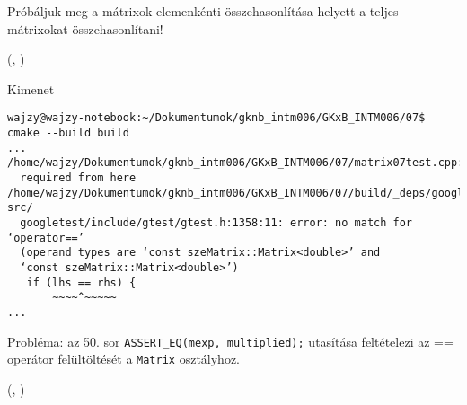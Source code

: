 \begin{frame}
  Próbáljuk meg a mátrixok elemenkénti összehasonlítása helyett a teljes mátrixokat összehasonlítani!
  \begin{exampleblock}{ %
    (, %
     )}
    \scriptsize
    
  \end{exampleblock}
\end{frame}

\begin{frame}
  \begin{exampleblock}{}
    
  \end{exampleblock}
\end{frame}

\begin{frame}[fragile]
  \begin{block}{Kimenet}
    \footnotesize
    \begin{verbatim}
wajzy@wajzy-notebook:~/Dokumentumok/gknb_intm006/GKxB_INTM006/07$ cmake --build build
...
/home/wajzy/Dokumentumok/gknb_intm006/GKxB_INTM006/07/matrix07test.cpp:50:3:   
  required from here
/home/wajzy/Dokumentumok/gknb_intm006/GKxB_INTM006/07/build/_deps/googletest-src/
  googletest/include/gtest/gtest.h:1358:11: error: no match for ‘operator==’ 
  (operand types are ‘const szeMatrix::Matrix<double>’ and 
  ‘const szeMatrix::Matrix<double>’)
   if (lhs == rhs) {
       ~~~~^~~~~~
...
\end{verbatim}
  \end{block}
  \vspace{-0.3cm}
  Probléma: az 50. sor \texttt{ASSERT\_EQ(mexp, multiplied);} utasítása feltételezi az == operátor felültöltését a 
\texttt{Matrix} osztályhoz.
\end{frame}

\begin{frame}
  \begin{exampleblock}{ %
    (, %
     )}
    \footnotesize
    
    
    
    
  \end{exampleblock}
\end{frame}

